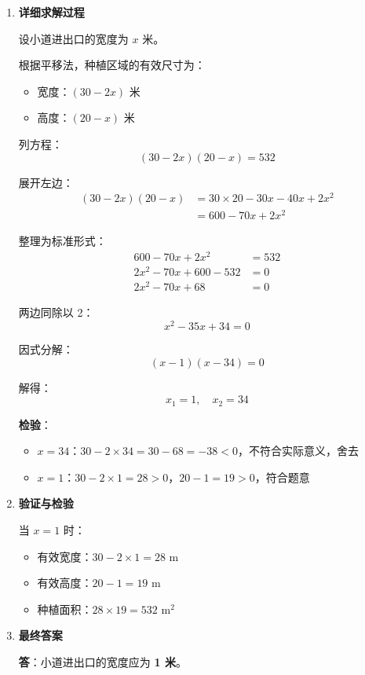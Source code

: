 \documentclass[UTF8]{ctexart}
\newenvironment{redenv}{\color{red}}{}
\newenvironment{detailedanalysis}{%
    \color{red}
    \begin{enumerate}[label=\textbf{第\arabic*步：}, leftmargin=*, align=left, itemsep=1.5ex]
}{%
    \end{enumerate}
}
\begin{document}
\begin{redenv}
\begin{detailedanalysis}
\item \textbf{详细求解过程}

设小道进出口的宽度为 $x$ 米。

根据平移法，种植区域的有效尺寸为：
\begin{itemize}
    \item 宽度：$(30 - 2x)$ 米
    \item 高度：$(20 - x)$ 米
\end{itemize}

列方程：
\[
(30 - 2x)(20 - x) = 532
\]

展开左边：
\begin{align*}
(30 - 2x)(20 - x) &= 30 \times 20 - 30x - 40x + 2x^2 \\
&= 600 - 70x + 2x^2
\end{align*}

整理为标准形式：
\begin{align*}
600 - 70x + 2x^2 &= 532 \\
2x^2 - 70x + 600 - 532 &= 0 \\
2x^2 - 70x + 68 &= 0
\end{align*}

两边同除以 2：
\[
x^2 - 35x + 34 = 0
\]

因式分解：
\[
(x - 1)(x - 34) = 0
\]

解得：
\[
x_1 = 1, \quad x_2 = 34
\]

\textbf{检验}：
\begin{itemize}
    \item $x = 34$：$30 - 2 \times 34 = 30 - 68 = -38 < 0$，不符合实际意义，舍去
    \item $x = 1$：$30 - 2 \times 1 = 28 > 0$，$20 - 1 = 19 > 0$，符合题意
\end{itemize}

\item \textbf{验证与检验}

当 $x = 1$ 时：
\begin{itemize}
    \item 有效宽度：$30 - 2 \times 1 = 28$ m
    \item 有效高度：$20 - 1 = 19$ m
    \item 种植面积：$28 \times 19 = 532$ m$^2$ \checkmark
\end{itemize}

\item \textbf{最终答案}

\textbf{答}：小道进出口的宽度应为 \textbf{1 米}。
\end{detailedanalysis}


\end{redenv}
\end{document}
